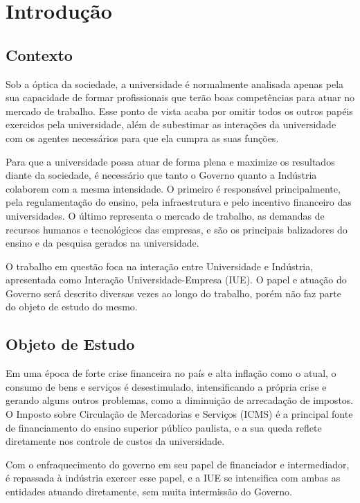 \chapter[Introdução]{Introdução}
\label{chap:introducao}
\section{Contexto}
\label{cha:contexto}

Sob a óptica da sociedade, a universidade é normalmente analisada apenas pela sua capacidade de formar profissionais que terão boas competências para atuar no mercado de trabalho. Esse ponto de vista acaba por omitir todos os outros papéis exercidos pela universidade, além de subestimar as interações da universidade com os agentes necessários para que ela cumpra as suas funções.

Para que a universidade possa atuar de forma plena e maximize os resultados diante da sociedade, é necessário que tanto o Governo quanto a Indústria colaborem com a mesma intensidade. O primeiro é responsável principalmente, pela regulamentação do ensino, pela infraestrutura e pelo incentivo financeiro das universidades. O último representa o mercado de trabalho, as demandas de recursos humanos e tecnológicos das empresas, e são os principais balizadores do ensino e da pesquisa gerados na universidade.

O trabalho em questão foca na interação entre Universidade e Indústria, apresentada como Interação Universidade-Empresa (IUE). O papel e atuação do Governo será descrito diversas vezes ao longo do trabalho, porém não faz parte do objeto de estudo do mesmo.

\section{Objeto de Estudo}

Em uma época de forte crise financeira no país e alta inflação como o atual, o consumo de bens e serviços é desestimulado, intensificando a própria crise e gerando alguns outros problemas, como a diminuição de arrecadação de impostos. O Imposto sobre Circulação de Mercadorias e Serviços (ICMS) é a principal fonte de financiamento do ensino superior público paulista, e a sua queda reflete diretamente nos controle de custos da universidade.

Com o enfraquecimento do governo em seu papel de financiador e intermediador, é repassada à indústria exercer esse papel, e a IUE se intensifica com ambas as entidades atuando diretamente, sem muita intermissão do Governo.

